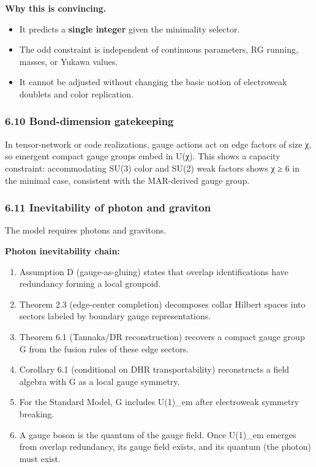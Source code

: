 \textbf{Why this is convincing.}

\begin{itemize}
\tightlist
\item
  It predicts a \textbf{single integer} given the minimality selector.
\item
  The odd constraint is independent of continuous parameters, RG running, masses, or Yukawa values.
\item
  It cannot be adjusted without changing the basic notion of electroweak doublets and color replication.
\end{itemize}

\subsubsection{6.10 Bond-dimension gatekeeping}\label{610-bond-dimension-gatekeeping}

In tensor-network or code realizations, gauge actions act on edge factors of size χ, so emergent compact gauge groups embed in U(χ). This shows a capacity constraint: accommodating SU(3) color and SU(2) weak factors shows χ ≥ 6 in the minimal case, consistent with the MAR-derived gauge group.

\subsubsection{6.11 Inevitability of photon and graviton}\label{611-inevitability-of-photon-and-graviton}

The model requires photons and gravitons.

\textbf{Photon inevitability chain:}

\begin{enumerate}
\def\labelenumi{\arabic{enumi}.}
\tightlist
\item
  Assumption D (gauge-as-gluing) states that overlap identifications have redundancy forming a local groupoid.
\item
  Theorem 2.3 (edge-center completion) decomposes collar Hilbert spaces into sectors labeled by boundary gauge representations.
\item
  Theorem 6.1 (Tannaka/DR reconstruction) recovers a compact gauge group G from the fusion rules of these edge sectors.
\item
  Corollary 6.1 (conditional on DHR transportability) reconstructs a field algebra with G as a local gauge symmetry.
\item
  For the Standard Model, G includes U(1)\_em after electroweak symmetry breaking.
\item
  A gauge boson is the quantum of the gauge field. Once U(1)\_em emerges from overlap redundancy, its gauge field exists, and its quantum (the photon) must exist.
\end{enumerate}

